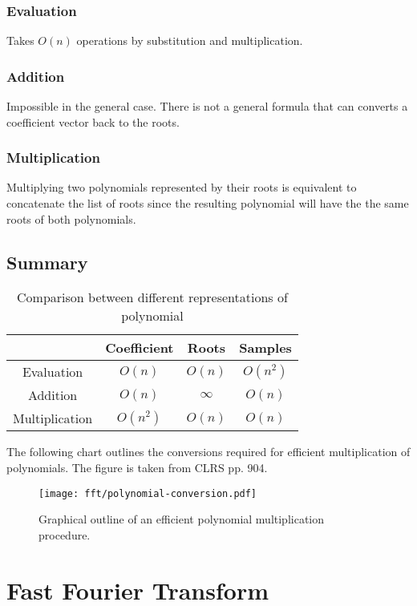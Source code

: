 \subsubsection{Evaluation}
Takes $O(n)$ operations by substitution and multiplication.

\subsubsection{Addition}
Impossible in the general case. There is not a general formula that can converts a coefficient vector back to the roots.

\subsubsection{Multiplication}
Multiplying two polynomials represented by their roots is equivalent to concatenate the list of roots since the resulting polynomial will have the the same roots of both polynomials.

\subsection{Summary}

\begin{table}[htpb]
    \centering
    \begin{tabular}{c|c|c|c}
    & Coefficient & Roots & Samples \\
    \hline
    Evaluation & $O(n)$ & $O(n)$ & $O(n^2)$ \\
    \hline
    Addition & $O(n)$ & $\infty$ & $O(n)$ \\
    \hline
    Multiplication & $O(n^2)$ & $O(n)$ & $O(n)$  
    \end{tabular}
    \caption{Comparison between different representations of polynomial}
    \label{tab:polynomial-rep-comparison}
\end{table}

The following chart outlines the conversions required for efficient multiplication of polynomials. The figure is taken from CLRS pp. 904.

\begin{figure}[htbp]
    \centering
    \texttt{[image: fft/polynomial-conversion.pdf]}
    \caption{Graphical outline of an efficient polynomial multiplication procedure.}
    \label{fig:fft-polynomial-conversion}
\end{figure}

\section{Fast Fourier Transform}

